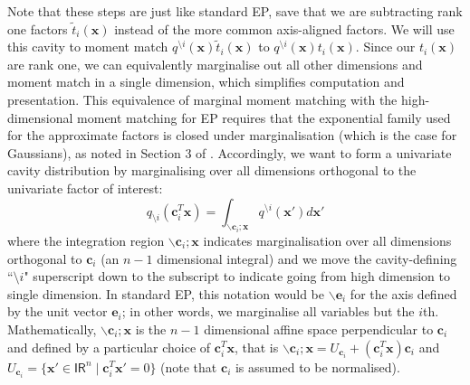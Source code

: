 \documentclass[twoside,11pt]{article}
\def\x{{\mathbf x}}
\def\c{{\mathbf c}}
\def\e{{\mathbf e}}
\newcommand{\reals}{\mathsf{I\!R}}
\newcommand{\wo}{\setminus}
\begin{document}
Note that these steps are just like standard EP, save that we are subtracting rank one factors $\tilde{t}_i(\x)$ instead of the more common axis-aligned factors.  We will use this cavity to moment match $q^{\wo i}(\x)\tilde{t}_i(\x)$ to $q^{\wo i}(\x)t_i(\x)$.  Since our $t_i(\x)$ are rank one, we can equivalently marginalise out all other dimensions and moment match in a single dimension, which simplifies computation and presentation.  This equivalence of marginal moment matching with the high-dimensional moment matching for EP requires that the exponential family used for the approximate factors is closed under marginalisation (which is the case for Gaussians), as noted in Section 3 of \cite{seeger08epexpfam}.  Accordingly, we want to form a univariate cavity distribution by marginalising over all dimensions orthogonal to the univariate factor of interest:
\begin{equation}
q_{\wo i}(\c_i^T\x) = \int_{\backslash \c_i;\x} q^{\wo i}(\x') d\x'
\end{equation}
where the integration region $\backslash \c_i;\x$ indicates marginalisation over all dimensions orthogonal to $\c_i$ (an $n-1$ dimensional integral) and we move the cavity-defining ``$\wo i$" superscript down to the subscript to indicate going from high dimension to single dimension.  In standard EP, this notation would be $\backslash \e_i$ for the axis defined by the unit vector $\e_i$; in other words, we marginalise all variables but the $i$th.  Mathematically, $\backslash \c_i;\x$ is the $n-1$ dimensional affine space perpendicular to $\c_i$ and defined by a particular choice of $\c_i^T\x$, that is $\backslash \c_i;\x = U_{\c_i} + (\c_i^T\x) \c_i$ and $U_{\c_i} = \bigl\{ \x'\in\reals^n \mid \c_i^T\x' = 0 \bigr\}$ (note that $\c_i$ is assumed to be normalised).
\end{document}
